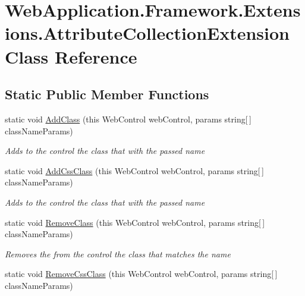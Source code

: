 \hypertarget{classWebApplication_1_1Framework_1_1Extensions_1_1AttributeCollectionExtension}{}\section{Web\+Application.\+Framework.\+Extensions.\+Attribute\+Collection\+Extension Class Reference}
\label{classWebApplication_1_1Framework_1_1Extensions_1_1AttributeCollectionExtension}
\subsection*{Static Public Member Functions}
\begin{DoxyCompactItemize}
\item 
static void \mbox{\hyperlink{classWebApplication_1_1Framework_1_1Extensions_1_1AttributeCollectionExtension_abc9cbb51515a7c876753483c80476567}{Add\+Class}} (this Web\+Control web\+Control, params string\mbox{[}$\,$\mbox{]} class\+Name\+Params)
\begin{DoxyCompactList}\small\item\em Adds to the control the class that with the passed name \end{DoxyCompactList}\item 
static void \mbox{\hyperlink{classWebApplication_1_1Framework_1_1Extensions_1_1AttributeCollectionExtension_a84b3934d3bbed2605e8ded47f753978e}{Add\+Css\+Class}} (this Web\+Control web\+Control, params string\mbox{[}$\,$\mbox{]} class\+Name\+Params)
\begin{DoxyCompactList}\small\item\em Adds to the control the class that with the passed name \end{DoxyCompactList}\item 
static void \mbox{\hyperlink{classWebApplication_1_1Framework_1_1Extensions_1_1AttributeCollectionExtension_a2dc3ed0df510cee26b03ee2a2c858fad}{Remove\+Class}} (this Web\+Control web\+Control, params string\mbox{[}$\,$\mbox{]} class\+Name\+Params)
\begin{DoxyCompactList}\small\item\em Removes the from the control the class that matches the name \end{DoxyCompactList}\item 
static void \mbox{\hyperlink{classWebApplication_1_1Framework_1_1Extensions_1_1AttributeCollectionExtension_a57da0b59b4e4617987344f8471a5d4d1}{Remove\+Css\+Class}} (this Web\+Control web\+Control, params string\mbox{[}$\,$\mbox{]} class\+Name\+Params)

\end{DoxyCompactItemize}
